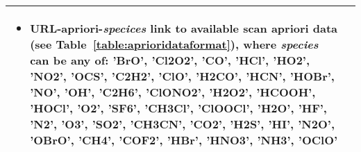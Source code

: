 \begin{table}
\begin{longtable}{| p{} | p{} |}
\begin{itemize}
                             \item URL-apriori-\textit{specices} link to available scan apriori data 
                              (see Table~\ref{table:aprioridataformat}),
                              where \textit{species} can be any of: 'BrO', 'Cl2O2', 'CO', 'HCl', 'HO2', 'NO2',
                              'OCS', 'C2H2', 'ClO', 'H2CO', 'HCN', 'HOBr', 'NO', 'OH', 'C2H6', 'ClONO2', 'H2O2',
                              'HCOOH', 'HOCl', 'O2', 'SF6', 'CH3Cl', 'ClOOCl', 'H2O', 'HF', 'N2', 'O3', 'SO2',
                              'CH3CN', 'CO2', 'H2S', 'HI', 'N2O', 'OBrO', 'CH4', 'COF2', 'HBr', 'HNO3', 'NH3', 'OClO'
                            \end{itemize}
\\ \hline
                                
\hline
\end{longtable}
\end{table}
\addtocounter{table}{-1}
  


\clearpage
\newpage

